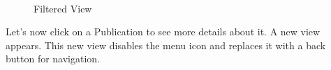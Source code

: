 \begin{figure}[H]
        \myfloatalign
         \quad
         \\
        \caption[Filtered View]{Filtered View}
\end{figure}

Let's now click on a Publication to see more details about it. A new view appears. This new view disables the menu icon and replaces it with a back button for navigation.

